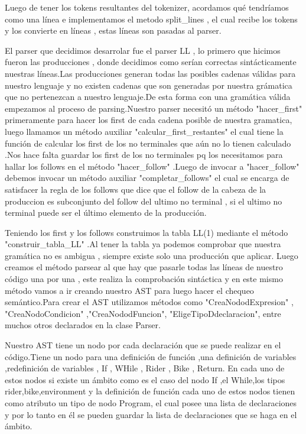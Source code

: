 \documentclass[12pt, letterpaper,spanish]{article}
\theoremstyle{definition}
\theoremstyle{remark}
\begin{document}
        Luego de tener los tokens resultantes del tokenizer, acordamos qué tendríamos como una línea e implementamos el metodo split_lines , el cual
        recibe los tokens y los convierte en líneas , estas líneas son pasadas al parser.

        El parser que decidimos desarrolar fue el parser LL , lo primero que hicimos fueron las producciones , donde decidimos como serían correctas
        sintácticamente nuestras líneas.Las producciones generan todas las posibles cadenas válidas para nuestro lenguaje y no existen cadenas
        que son generadas por nuestra grámatica que no pertenezcan a nuestro lenguaje.De esta forma con una gramática válida empezamos al proceso
        de parsing.Nuestro parser necesitó un método "hacer_first" primeramente para hacer los first de cada cadena posible de nuestra gramatica,
        luego llamamos un método auxiliar "calcular_first_restantes" el cual tiene la función de calcular los first de los no terminales que aún
        no lo tienen calculado .Nos hace falta guardar los first de los no terminales pq los necesitamos para hallar los follows en el método
        "hacer_follow" .Luego de invocar a "hacer_follow" debemos invocar un método auxiliar "completar_follows" el cual se encarga de satisfacer
        la regla de los follows que dice que el follow de la cabeza de la produccion es subconjunto del follow del ultimo no terminal , si el ultimo
        no terminal puede ser el último elemento de la producción.

        Teniendo los first y los follows construimos la tabla LL(1) mediante el método "construir_tabla_LL" .Al tener la tabla ya podemos comprobar
        que nuestra gramática no es ambigua , siempre existe solo una producción que aplicar. Luego creamos el método parsear al que hay que pasarle
        todas las líneas de nuestro código una por una , este realiza la comprobación sintáctica y en este mismo método vamos a ir creando nuestro
        AST para luego hacer el chequeo semántico.Para crear el AST utilizamos métodos como "CreaNododExpresion" ,  "CreaNodoCondicion" ,"CreaNododFuncion",
        "EligeTipoDdeclaracion", entre muchos otros declarados en la clase Parser. 

        Nuestro AST tiene un nodo por cada declaración que se puede realizar en el código.Tiene un nodo para una definición de función ,una 
        definición de variables ,redefinición de variables , If , WHile , Rider , Bike , Return. En cada uno de estos nodos si existe
        un ámbito como es el caso del nodo If ,el While,los tipos rider,bike,environment y la definición de función cada uno de estos nodos tienen 
        como atributo un tipo de nodo Program, el cual posee una lista de declaraciones y por lo tanto en él se pueden guardar la lista de declaraciones
        que se haga en el ámbito.
\end{document}
